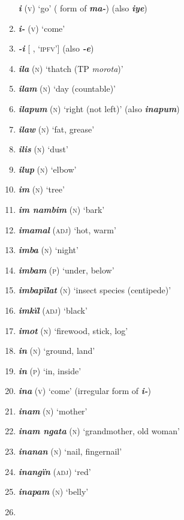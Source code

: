 \begin{enumerate}[noitemsep, label={}, align=left, widest=190, labelsep=1ex,leftmargin=*,itemindent=-10pt]
\textbf{\textit{i}} (\textsc{v)} ‘go’ (  form of \textbf{\textit{ma-}}) (also \textbf{\textit{iye}}) \item
\textbf{\textit{i-}} (\textsc{v)} ‘come’ \item
\textbf{\textit{-i}} [ , ‘\textsc{ipfv}’] (also \textbf{\textit{-e}}) \item
\textbf{\textit{ila}} (\textsc{n)} ‘thatch (TP \textit{morota})’ \item
\textbf{\textit{ilam}} (\textsc{n)} ‘day (countable)’ \item
\textbf{\textit{ilapum}} (\textsc{n)} ‘right (not left)’ (also \textbf{\textit{inapum}}) \item
\textbf{\textit{ilaw}} (\textsc{n)} ‘fat, grease’ \item
\textbf{\textit{ilis}} (\textsc{n)} ‘dust’ \item
\textbf{\textit{ilup}} (\textsc{n)} ‘elbow’ \item
\textbf{\textit{im}} (\textsc{n)} ‘tree’ \item
\textbf{\textit{im nambim}} (\textsc{n)} ‘bark’ \item
\textbf{\textit{imamal}} (\textsc{adj)} ‘hot, warm’ \item
\textbf{\textit{imba}} (\textsc{n)} ‘night’ \item
\textbf{\textit{imbam}} (\textsc{p)} ‘under, below’ \item
\textbf{\textit{imbapïlat}} (\textsc{n)} ‘insect species (centipede)’ \item
\textbf{\textit{imkïl}} (\textsc{adj)} ‘black’ \item
\textbf{\textit{imot}} (\textsc{n)} ‘firewood, stick, log’ \item
\textbf{\textit{in}} (\textsc{n)} ‘ground, land’ \item
\textbf{\textit{in}} (\textsc{p)} ‘in, inside’ \item
\textbf{\textit{ina}} (\textsc{v)} ‘come’ (irregular  form of \textbf{\textit{i-}}) \item
\textbf{\textit{inam}} (\textsc{n)} ‘mother’ \item
\textbf{\textit{inam ngata}} (\textsc{n)} ‘grandmother, old woman’ \item
\textbf{\textit{inanan}} (\textsc{n)} ‘nail, fingernail’ \item
\textbf{\textit{inangïn}} (\textsc{adj)} ‘red’ \item
\textbf{\textit{inapam}} (\textsc{n)} ‘belly’ \item

\end{enumerate}
